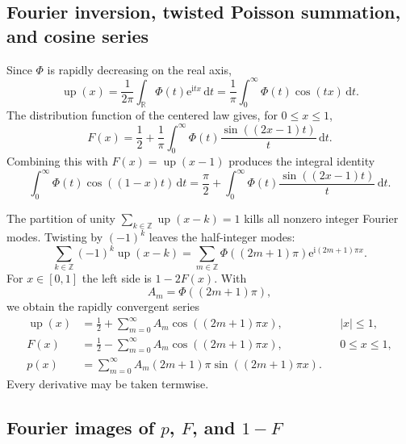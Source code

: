 \documentclass[11pt,oneside]{article}
\theoremstyle{definition}
\theoremstyle{remark}
\newcommand{\R}{\mathbb R}
\newcommand{\Z}{\mathbb Z}
\newcommand{\Up}{\operatorname{up}}
\newcommand{\e}{\mathrm e}
\newcommand{\ii}{\mathrm i}
\newcommand{\dd}{\,\mathrm d}
\begin{document}
\subsection{Fourier inversion, twisted Poisson summation, and cosine series}

Since $\Phi$ is rapidly decreasing on the real axis,
\begin{equation}\label{eq:up-Fourier-inversion}
 \Up(x)=\frac1{2\pi}\int_\R\Phi(t)\e^{\ii tx}\dd t
 =\frac1\pi\int_0^\infty\Phi(t)\cos(tx)\dd t.
\end{equation}
The distribution function of the centered law gives, for $0\le x\le1$,
\begin{equation}\label{eq:F-GilPelaez}
 F(x)=\frac12+\frac1\pi\int_0^\infty
 \Phi(t)\frac{\sin((2x-1)t)}{t}\dd t.
\end{equation}
Combining this with $F(x)=\Up(x-1)$ produces the integral identity
\begin{equation}\label{eq:sine-cosine-duality}
 \int_0^\infty\Phi(t)\cos((1-x)t)\dd t
 =\frac\pi2+\int_0^\infty\Phi(t)
   \frac{\sin((2x-1)t)}{t}\dd t.
\end{equation}

The partition of unity $\sum_{k\in\Z}\Up(x-k)=1$ kills all nonzero integer
Fourier modes.  Twisting by $(-1)^k$ leaves the half-integer modes:
\begin{equation}\label{eq:twisted-Poisson}
 \sum_{k\in\Z}(-1)^k\Up(x-k)
 =\sum_{m\in\Z}\Phi((2m+1)\pi)\e^{\ii(2m+1)\pi x}.
\end{equation}
For $x\in[0,1]$ the left side is $1-2F(x)$.  With
\begin{equation}\label{eq:A_m}
 A_m=\Phi((2m+1)\pi),
\end{equation}
we obtain the rapidly convergent series
\begin{align}
 \Up(x)&=\frac12+\sum_{m=0}^\infty A_m
          \cos((2m+1)\pi x), &&|x|\le1,\label{eq:up-half-series}\\
 F(x)&=\frac12-\sum_{m=0}^\infty A_m
          \cos((2m+1)\pi x), &&0\le x\le1,\label{eq:F-half-series}\\
 p(x)&=\sum_{m=0}^\infty A_m(2m+1)\pi
          \sin((2m+1)\pi x).\label{eq:p-half-series}
\end{align}
Every derivative may be taken termwise.

\subsection{Fourier images of $p$, $F$, and $1-F$}
\end{document}
